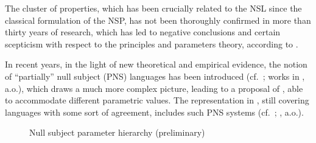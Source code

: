 \documentclass[output=paper]{langsci/langscibook}
\begin{document}
The cluster of properties, which has been crucially related to the \gls{NSL}
since the classical formulation of the \gls{NSP}, has not been thoroughly
confirmed in more than thirty years of research, which has led to negative
conclusions and certain scepticism with respect to the principles and
parameters theory, according to \citet{RobHol2010}.

 In recent years, in the light of new theoretical and empirical
evidence, the notion of “partially” null subject (\gls{PNS}) languages has been
introduced (cf.\ \citealt{Holmberg2005}; works in
\citealt{Biberauer2008,BibHolRobShee2010}, a.o.), which draws a much more
complex picture, leading to a proposal of , able to
accommodate different parametric values. The representation in ,
still covering languages with some sort of agreement, includes such \gls{PNS}
systems (cf.\ \citealt{HolShee2010}; \citealt[6]{Sheehan2014b}, a.o.).\largerpage[2]

\begin{figure}
    \caption{Null subject parameter hierarchy (preliminary)}\label{fig:ex:26.1}
\end{figure}
\end{document}
